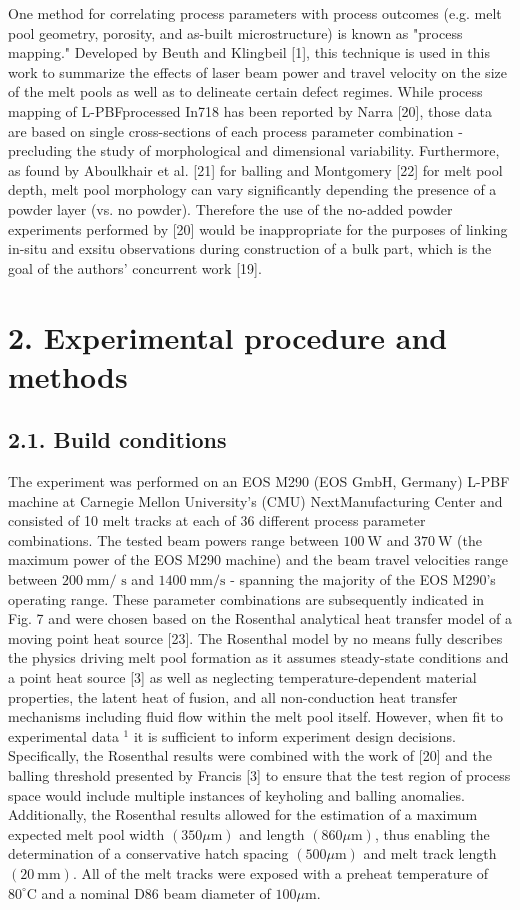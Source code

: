 \documentclass[10pt]{article}
\begin{document}
One method for correlating process parameters with process outcomes (e.g. melt pool geometry, porosity, and as-built microstructure) is known as "process mapping." Developed by Beuth and Klingbeil [1], this technique is used in this work to summarize the effects of laser beam power and travel velocity on the size of the melt pools as well as to delineate certain defect regimes. While process mapping of L-PBFprocessed In718 has been reported by Narra [20], those data are based on single cross-sections of each process parameter combination - precluding the study of morphological and dimensional variability. Furthermore, as found by Aboulkhair et al. [21] for balling and Montgomery [22] for melt pool depth, melt pool morphology can vary significantly depending the presence of a powder layer (vs. no powder). Therefore the use of the no-added powder experiments performed by [20] would be inappropriate for the purposes of linking in-situ and exsitu observations during construction of a bulk part, which is the goal of the authors' concurrent work [19].

\section*{2. Experimental procedure and methods}
\subsection*{2.1. Build conditions}
The experiment was performed on an EOS M290 (EOS GmbH, Germany) L-PBF machine at Carnegie Mellon University's (CMU) NextManufacturing Center and consisted of 10 melt tracks at each of 36 different process parameter combinations. The tested beam powers range between $100 \mathrm{~W}$ and $370 \mathrm{~W}$ (the maximum power of the EOS M290 machine) and the beam travel velocities range between $200 \mathrm{~mm} /$ $\mathrm{s}$ and $1400 \mathrm{~mm} / \mathrm{s}$ - spanning the majority of the EOS M290's operating range. These parameter combinations are subsequently indicated in Fig. 7 and were chosen based on the Rosenthal analytical heat transfer model of a moving point heat source [23]. The Rosenthal model by no means fully describes the physics driving melt pool formation as it assumes steady-state conditions and a point heat source [3] as well as neglecting temperature-dependent material properties, the latent heat of fusion, and all non-conduction heat transfer mechanisms including fluid flow within the melt pool itself. However, when fit to experimental data ${ }^{1}$ it is sufficient to inform experiment design decisions. Specifically, the Rosenthal results were combined with the work of [20] and the balling threshold presented by Francis [3] to ensure that the test region of process space would include multiple instances of keyholing and balling anomalies. Additionally, the Rosenthal results allowed for the estimation of a maximum expected melt pool width $(350 \mu \mathrm{m})$ and length $(860 \mu \mathrm{m})$, thus enabling the determination of a conservative hatch spacing $(500 \mu \mathrm{m})$ and melt track length $(20 \mathrm{~mm})$. All of the melt tracks were exposed with a preheat temperature of $80^{\circ} \mathrm{C}$ and a nominal D86 beam diameter of $100 \mu \mathrm{m}$.
\end{document}
